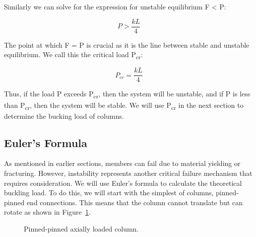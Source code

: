 \documentclass[
  letterpaper,
  DIV=11,
  numbers=noendperiod]{scrreprt}
\theoremstyle{definition}
\theoremstyle{remark}
\begin{document}
Similarly we can solve for the expression for unstable equilibrium F
\textless{} P:

\[
P>\frac{k L}{4}
\]

The point at which F = P is crucial as it is the line between stable and
unstable equilibrium. We call this the critical load
P\textsubscript{cr}:

\[
P_{c r}=\frac{k L}{4}
\]

Thus, if the load P exceeds P\textsubscript{cr}, then the system will be
unstable, and if P is less than P\textsubscript{cr}, then the system
will be stable. We will use P\textsubscript{cr} in the next section to
determine the bucking load of columns.

\subsection{Euler's Formula}\label{eulers-formula}

As mentioned in earlier sections, members can fail due to material
yielding or fracturing. However, instability represents another critical
failure mechanism that requires consideration. We will use Euler's
formula to calculate the theoretical buckling load. To do this, we will
start with the simplest of columns, pinned-pinned end connections. This
means that the column cannot translate but can rotate as shown in
Figure~\ref{fig-15.4}.

\begin{figure}


\caption{\label{fig-15.4}Pinned-pinned axially loaded column.}

\end{figure}%
\end{document}
